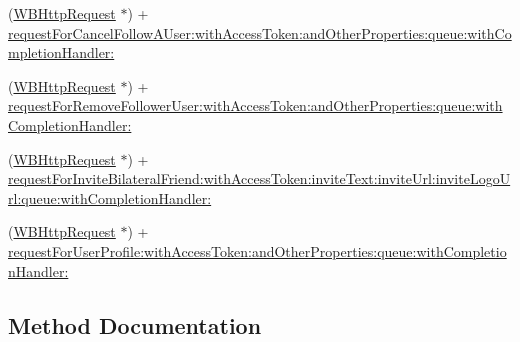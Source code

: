 \begin{DoxyCompactItemize}
\item 
(\mbox{\hyperlink{interface_w_b_http_request}{W\+B\+Http\+Request}} $\ast$) + \mbox{\hyperlink{category_w_b_http_request_07_weibo_user_08_a0a601918d65f1776f99882facc1349e3}{request\+For\+Cancel\+Follow\+A\+User\+:with\+Access\+Token\+:and\+Other\+Properties\+:queue\+:with\+Completion\+Handler\+:}}
\item 
(\mbox{\hyperlink{interface_w_b_http_request}{W\+B\+Http\+Request}} $\ast$) + \mbox{\hyperlink{category_w_b_http_request_07_weibo_user_08_abb1e37b606f28ab890279b1ce62de963}{request\+For\+Remove\+Follower\+User\+:with\+Access\+Token\+:and\+Other\+Properties\+:queue\+:with\+Completion\+Handler\+:}}
\item 
(\mbox{\hyperlink{interface_w_b_http_request}{W\+B\+Http\+Request}} $\ast$) + \mbox{\hyperlink{category_w_b_http_request_07_weibo_user_08_a82d133ab6df8bbd0b61a6bbdd56fa499}{request\+For\+Invite\+Bilateral\+Friend\+:with\+Access\+Token\+:invite\+Text\+:invite\+Url\+:invite\+Logo\+Url\+:queue\+:with\+Completion\+Handler\+:}}
\item 
(\mbox{\hyperlink{interface_w_b_http_request}{W\+B\+Http\+Request}} $\ast$) + \mbox{\hyperlink{category_w_b_http_request_07_weibo_user_08_ac5c54cd942ec3972dce639a4a299d812}{request\+For\+User\+Profile\+:with\+Access\+Token\+:and\+Other\+Properties\+:queue\+:with\+Completion\+Handler\+:}}
\end{DoxyCompactItemize}


\subsection{Method Documentation}
\mbox{\label{category_w_b_http_request_07_weibo_user_08_a158110b5d079d1ddd7baae029a8a36fb}} 
